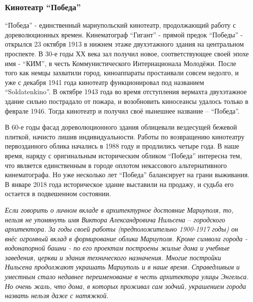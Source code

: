  
 
 
 
 

\subsubsection{Кинотеатр \enquote{Победа}}

\enquote{Победа} - единственный мариупольский кинотеатр, продолжающий работу с
дореволюционных времен. Кинематограф \enquote{Гигант} - прямой предок
\enquote{Победы} - открылся 23 октября 1913 в нижнем этаже двухэтажного здания
на центральном проспекте. В 30-е годы ХХ века зал получил новое,
соответствующее своей эпохе имя - \enquote{КИМ}, в честь Коммунистического
Интернационала Молодёжи. После того как немцы захватили город, киноаппараты
простаивали совсем недолго, и уже с декабря 1941 года кинотеатр функционировал
под названием \enquote{Soldatenkino}. В октябре 1943 года во время отступления вермахта
двухэтажное здание сильно пострадало от пожара, и возобновить киносеансы
удалось только в феврале 1946. Тогда кинотеатр и получил своё нынешнее название
– \enquote{Победа}.


В 60-е годы фасад дореволюционного здания облицевали вездесущей бежевой
плиткой, начисто лишив индивидуальности. Работы по возвращению кинотеатру
первозданного облика начались в 1988 году и продлились четыре года. В наше
время, наряду с оригинальным историческим обликом \enquote{Победа} интересна
тем, что является единственным в городе оплотом некассового альтернативного
кинематографа. Но уже несколько лет \enquote{Победа} балансирует на грани
выживания. В январе 2018 года историческое здание выставили на продажу, и
судьба его остается в подвешенном состоянии.


\emph{Если говорить о личном вкладе в архитектурное достояние Мариуполя, то, нельзя
не упомянуть имя Виктора Александровича Нильсена – городского архитектора. За
годы своей работы (предположительно 1900-1917 годы) он внёс огромный вклад в
формирование облика Мариуполя. Кроме символа города - водонапорной башни - по
его проектам построены жилые дома и учебные заведения, церкви и здания
технического назначения. Многие постройки Нильсена продолжают украшать
Мариуполь и в наше время. Справедливым и уместным стало недавнее переименование
в честь архитектора улицы Энгельса. Но очень жаль, что дома, в которых проживал
сам зодчий, украшением города назвать нельзя даже с натяжкой.}

